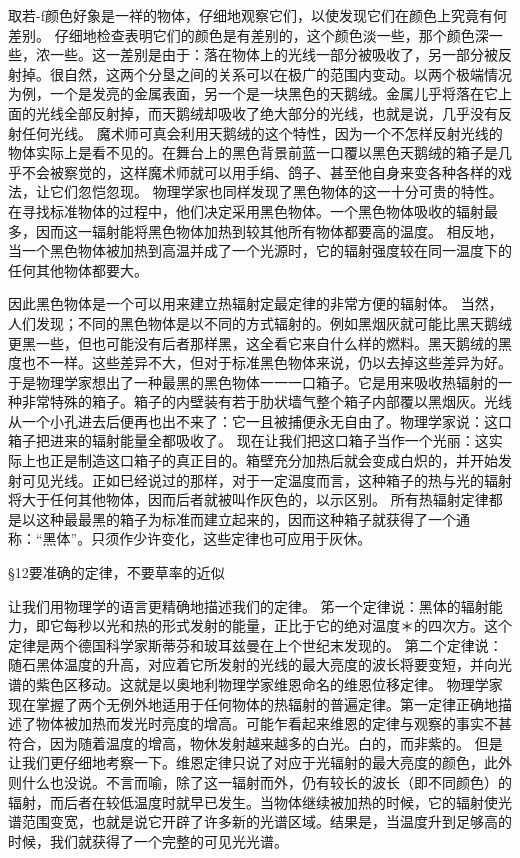 取若-f颜色好象是一祥的物体，仔细地观察它们，以使发现它们在颜色上究竟有何差别。
仔细地检查表明它们的颜色是有差别的，这个颜色淡一些，那个颜色深一些，浓一些。这一差别是由于：落在物体上的光线一部分被吸收了，另一部分被反射掉。很自然，这两个分垦之间的关系可以在极广的范围内变动。以两个极端情况为例，一个是发亮的金属表面，另一个是一块黑色的天鹅绒。金属儿乎将落在它上面的光线全部反射掉，而天鹅绒却吸收了绝大部分的光线，也就是说，几乎没有反射任何光线。
魔术师可真会利用天鹅绒的这个特性，因为一个不怎样反射光线的物体实际上是看不见的。在舞台上的黑色背景前蓝一口覆以黑色天鹅绒的箱子是几乎不会被察觉的，这样魔术师就可以用手绢、鸽子、甚至他自身来变各种各样的戏法，让它们忽恺忽现。
物理学家也同样发现了黑色物体的这一十分可贵的特性。在寻找标准物体的过程中，他们决定采用黑色物体。一个黑色物体吸收的辐射最多，因而这一辐射能将黑色物体加热到较其他所有物体都要高的温度。
相反地，当一个黑色物体被加热到高温并成了一个光源时，它的辐射强度较在同一温度下的任何其他物体都要大。

因此黑色物体是一个可以用来建立热辐射定最定律的非常方便的辐射体。
当然，人们发现；不同的黑色物体是以不同的方式辐射的。例如黑烟灰就可能比黑天鹅绒更黑一些，但也可能没有后者那样黑，这全看它来自什么样的燃料。黑天鹅绒的黑度也不一样。这些差异不大，但对于标准黑色物体来说，仍以去掉这些差异为好。
于是物理学家想出了一种最黑的黑色物体一一一口箱子。它是用来吸收热辐射的一种非常特殊的箱子。箱子的内壁装有若于肋状墙气整个箱子内部覆以黑烟灰。光线从一个小孔进去后便再也出不来了：它一且被捕便永无自由了。物理学家说：这口箱子把进来的辐射能量全都吸收了。
现在让我们把这口箱子当作一个光丽：这实际上也正是制造这口箱子的真正目的。箱壁充分加热后就会变成白炽的，并开始发射可见光线。正如巳经说过的那样，对于一定温度而言，这种箱子的热与光的辐射将大于任何其他物体，因而后者就被叫作灰色的，以示区别。
所有热辐射定律都是以这种最最黑的箱子为标准而建立起来的，因而这种箱子就获得了一个通称：“黑体”。只须作少许变化，这些定律也可应用于灰休。

§12要准确的定律，不要草率的近似

让我们用物理学的语言更精确地描述我们的定律。
笫一个定律说：黑体的辐射能力，即它每秒以光和热的形式发射的能量，正比于它的绝对温度＊的四次方。这个定律是两个德国科学家斯蒂芬和玻耳兹曼在上个世纪末发现的。
第二个定律说：随石黑体温度的升高，对应着它所发射的光线的最大亮度的波长将要变短，并向光谱的紫色区移动。这就是以奥地利物理学家维恩命名的维恩位移定律。
物理学家现在掌握了两个无例外地适用于任何物体的热辐射的普遍定律。第一定律正确地描述了物体被加热而发光时亮度的增高。可能乍看起来维恩的定律与观察的事实不甚符合，因为随着温度的增高，物休发射越来越多的白光。白的，而非紫的。
但是让我们更仔细地考察一下。维恩定律只说了对应于光辐射的最大亮度的颜色，此外则什么也没说。不言而喻，除了这一辐射而外，仍有较长的波长（即不同颜色）的辐射，而后者在较低温度时就早已发生。当物体继续被加热的时候，它的辐射使光谱范围变宽，也就是说它开辟了许多新的光谱区域。结果是，当温度升到足够高的时候，我们就获得了一个完整的可见光光谱。

